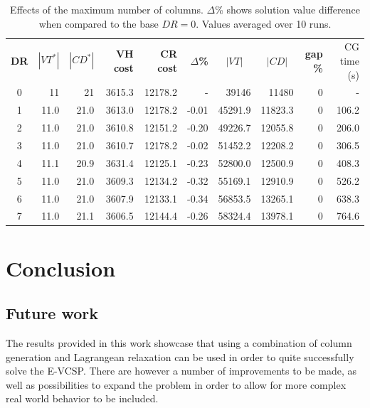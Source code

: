 \documentclass[]{article}
\begin{document}
\begin{table}[h]
  \centering
  \begin{tabular}{crrrrrrrrr}
    \toprule
       \textbf{DR} & $|VT^*|$ & $|CD^*|$ & \textbf{VH cost} & \textbf{CR cost} & \textbf{$\Delta$\%} & \multicolumn{1}{c}{$|VT|$} & \multicolumn{1}{c}{$|CD|$} & \textbf{gap \%} & CG time (s) \\
       \cmidrule(lr){1-1} \cmidrule(lr){2-6} \cmidrule(lr){7-8} \cmidrule(lr){9-10}
        0   & 11   & 21   & 3615.3 & 12178.2 & -    & 39146   & 11480 & 0 & -    \\
        1   & 11.0 & 21.0 & 3613.0 & 12178.2 & -0.01 & 45291.9 & 11823.3 & 0 & 106.2  \\
        2   & 11.0 & 21.0 & 3610.8 & 12151.2 & -0.20 & 49226.7 & 12055.8 & 0 & 206.0  \\
        3   & 11.0 & 21.0 & 3610.7 & 12178.2 & -0.02 & 51452.2 & 12208.2 & 0 & 306.5  \\
        4   & 11.1 & 20.9 & 3631.4 & 12125.1 & -0.23 & 52800.0 & 12500.9 & 0 & 408.3  \\
        5   & 11.0 & 21.0 & 3609.3 & 12134.2 & -0.32 & 55169.1 & 12910.9 & 0 & 526.2  \\
        6   & 11.0 & 21.0 & 3607.9 & 12133.1 & -0.34 & 56853.5 & 13265.1 & 0 & 638.3  \\
        7   & 11.0 & 21.1 & 3606.5 & 12144.4 & -0.26 & 58324.4 & 13978.1 & 0 & 764.6  \\
        \bottomrule
  \end{tabular}
  \caption{Effects of the maximum number of columns. $\Delta$\% shows solution value difference when compared to the base $DR=0$. Values averaged over 10 runs. }
  \label{tab:evcsp-max-cols}
\end{table}

\section{Conclusion}
\subsection{Future work}
The results provided in this work showcase that using a combination of column generation and Lagrangean relaxation can be used in order to quite successfully solve the E-VCSP. There are however a number of improvements to be made, as well as possibilities to expand the problem in order to allow for more complex real world behavior to be included. 
\end{document}
